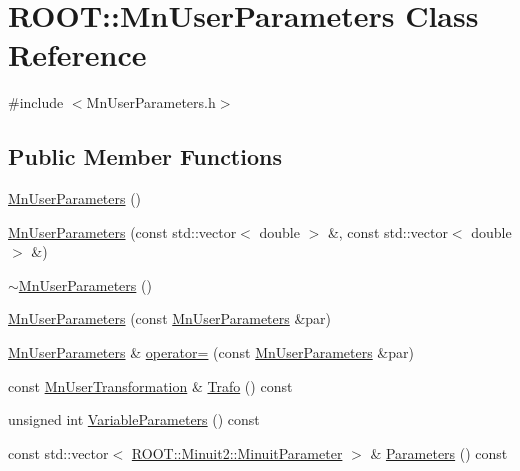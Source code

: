 \hypertarget{classROOT_1_1Minuit2_1_1MnUserParameters}{}\section{R\+O\+OT\+:\+:Mn\+User\+Parameters Class Reference}
\label{classROOT_1_1Minuit2_1_1MnUserParameters}


{\ttfamily \#include $<$Mn\+User\+Parameters.\+h$>$}

\subsection*{Public Member Functions}
\begin{DoxyCompactItemize}
\item 
\mbox{\hyperlink{classROOT_1_1Minuit2_1_1MnUserParameters_afc09ce197c2e03a228cc9cafc3855371}{Mn\+User\+Parameters}} ()
\item 
\mbox{\hyperlink{classROOT_1_1Minuit2_1_1MnUserParameters_a465242ec980354f799665ee8d2452d58}{Mn\+User\+Parameters}} (const std\+::vector$<$ double $>$ \&, const std\+::vector$<$ double $>$ \&)
\item 
\mbox{\hyperlink{classROOT_1_1Minuit2_1_1MnUserParameters_a3b2d1f74827108c7dc34a5eb879dcc24}{$\sim$\+Mn\+User\+Parameters}} ()
\item 
\mbox{\hyperlink{classROOT_1_1Minuit2_1_1MnUserParameters_aa4ba65a64a5dd051fecc3366c8e10617}{Mn\+User\+Parameters}} (const \mbox{\hyperlink{classROOT_1_1Minuit2_1_1MnUserParameters}{Mn\+User\+Parameters}} \&par)
\item 
\mbox{\hyperlink{classROOT_1_1Minuit2_1_1MnUserParameters}{Mn\+User\+Parameters}} \& \mbox{\hyperlink{classROOT_1_1Minuit2_1_1MnUserParameters_a21d8a1f70098c2c9c82015cf0867c8ea}{operator=}} (const \mbox{\hyperlink{classROOT_1_1Minuit2_1_1MnUserParameters}{Mn\+User\+Parameters}} \&par)
\item 
const \mbox{\hyperlink{classROOT_1_1Minuit2_1_1MnUserTransformation}{Mn\+User\+Transformation}} \& \mbox{\hyperlink{classROOT_1_1Minuit2_1_1MnUserParameters_ac5c3bff96b6fc41a790005f524e334db}{Trafo}} () const
\item 
unsigned int \mbox{\hyperlink{classROOT_1_1Minuit2_1_1MnUserParameters_af19ee84626fbdeb819e6a86e82794f19}{Variable\+Parameters}} () const
\item 
const std\+::vector$<$ \mbox{\hyperlink{classROOT_1_1Minuit2_1_1MinuitParameter}{R\+O\+O\+T\+::\+Minuit2\+::\+Minuit\+Parameter}} $>$ \& \mbox{\hyperlink{classROOT_1_1Minuit2_1_1MnUserParameters_a6b6a4cf33fb9e482a193db522763cd76}{Parameters}} () const

\end{DoxyCompactItemize}
